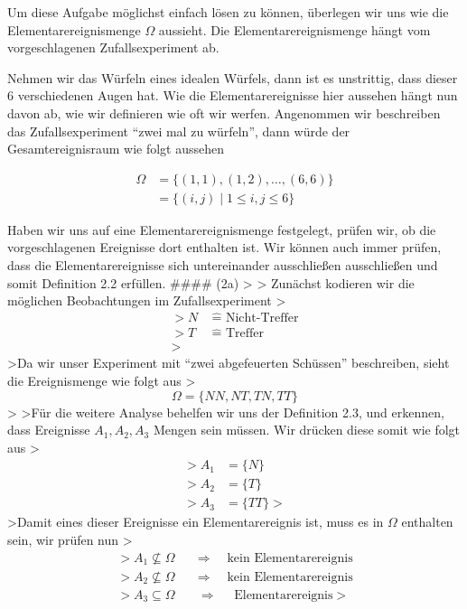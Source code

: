 \documentclass[
]{article}
\begin{document}
Um diese Aufgabe möglichst einfach lösen zu können, überlegen wir uns
wie die Elementarereignismenge \(\Omega\) aussieht. Die
Elementarereignismenge hängt vom vorgeschlagenen Zufallsexperiment ab.

Nehmen wir das Würfeln eines idealen Würfels, dann ist es unstrittig,
dass dieser 6 verschiedenen Augen hat. Wie die Elementarereignisse hier
aussehen hängt nun davon ab, wie wir definieren wie oft wir werfen.
Angenommen wir beschreiben das Zufallsexperiment ``zwei mal zu
würfeln'', dann würde der Gesamtereignisraum wie folgt aussehen

\[\begin{align}
 \Omega &= \{ (1,1), (1,2), \dots, (6,6) \} \\
&= \{ (i,j)\; | \; 1 \leq i,j \leq 6 \}
\end{align}\]

Haben wir uns auf eine Elementarereignismenge festgelegt, prüfen wir, ob
die vorgeschlagenen Ereignisse dort enthalten ist. Wir können auch immer
prüfen, dass die Elementarereignisse sich untereinander ausschließen
ausschließen und somit Definition 2.2 erfüllen. \#\#\#\# (2a)
\textgreater{} \textgreater{} Zunächst kodieren wir die möglichen
Beobachtungen im Zufallsexperiment \textgreater{} \[\begin{align}
> N &\; \widehat{ = } \text{ Nicht-Treffer}  \\
> T &\; \widehat{ = } \text{ Treffer}  \\
>\end{align}\] \textgreater Da wir unser Experiment mit ``zwei
abgefeuerten Schüssen'' beschreiben, sieht die Ereignismenge wie folgt
aus \textgreater{}\[\Omega =\{ NN, NT, TN, TT \}\] \textgreater{}
\textgreater Für die weitere Analyse behelfen wir uns der Definition
2.3, und erkennen, dass Ereignisse \(A_1, A_2, A_3\) Mengen sein müssen.
Wir drücken diese somit wie folgt aus \textgreater{}\[\begin{align}
> A_{1} &= \{ N \} \\
> A_{2} &= \{ T \} \\
> A_{3} &= \{  TT \}
>\end{align}\] \textgreater Damit eines dieser Ereignisse ein
Elementarereignis ist, muss es in \(\Omega\) enthalten sein, wir prüfen
nun \textgreater{}\[\begin{align}
> A_{1} \not\subseteq \Omega \quad &\Longrightarrow \quad \text{ kein Elementarereignis} \\
> A_{2} \not\subseteq \Omega \quad &\Longrightarrow \quad \text{ kein Elementarereignis} \\
> A_{3} \subseteq \Omega \quad &\Longrightarrow \quad \text{ Elementarereignis}
>\end{align}\]
\end{document}
